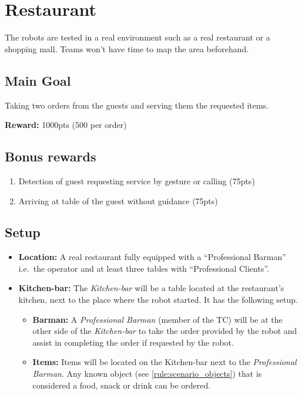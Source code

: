 \section{Restaurant}
The robots are tested in a real environment such as a real restaurant or a shopping mall. Teams won't have time to map the area beforehand.


\subsection{Main Goal}
Taking two orders from the guests and serving them the requested items. 

\noindent\textbf{Reward:} 1000pts (500 per order)

\subsection{Bonus rewards}
\begin{enumerate}[nosep]
	\item Detection of guest requesting service by gesture or calling (75pts)
	\item Arriving at table of the guest without guidance (75pts)
\end{enumerate}

\subsection{Setup}
\begin{itemize}[nosep]
	\item \textbf{Location:} A real restaurant fully equipped with a \enquote{Professional Barman} i.e.~the operator and at least three tables with \enquote{Professional Clients}.
    \item \textbf{Kitchen-bar:} The \textit{Kitchen-bar} will be a table located at the restaurant's kitchen, next to the place where the robot started. It has the following setup.
	\begin{itemize}[nosep]
		\item \textbf{Barman:} A \textit{Professional Barman} (member of the TC) will be at the other side of the \textit{Kitchen-bar} to take the order provided by the robot and assist in completing the order if requested by the robot.
		\item \textbf{Items:} Items will be located on the Kitchen-bar next to the \textit{Professional Barman}. Any known object (see \ref{rule:scenario_objects}) that is considered a food, snack or drink can be ordered.
	\end{itemize}
\end{itemize}


